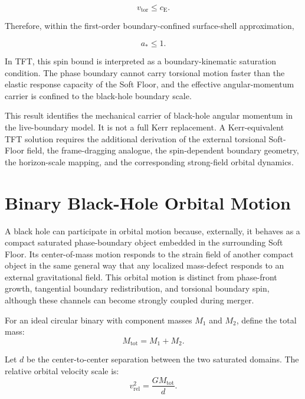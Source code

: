 \begin{equation}
    v_{\mathrm{tor}}
    \leq
    c_{\mathrm{E}}.
\end{equation}

Therefore, within the first-order boundary-confined surface-shell approximation,

\begin{equation}
    a_\ast
    \leq
    1.
\end{equation}

In TFT, this spin bound is interpreted as a boundary-kinematic saturation condition. The phase boundary cannot carry torsional motion faster than the elastic response capacity of the Soft Floor, and the effective angular-momentum carrier is confined to the black-hole boundary scale.

This result identifies the mechanical carrier of black-hole angular momentum in the live-boundary model. It is not a full Kerr replacement. A Kerr-equivalent TFT solution requires the additional derivation of the external torsional Soft-Floor field, the frame-dragging analogue, the spin-dependent boundary geometry, the horizon-scale mapping, and the corresponding strong-field orbital dynamics.

\section{Binary Black-Hole Orbital Motion}

A black hole can participate in orbital motion because, externally, it behaves as a compact saturated phase-boundary object embedded in the surrounding Soft Floor. Its center-of-mass motion responds to the strain field of another compact object in the same general way that any localized mass-defect responds to an external gravitational field. This orbital motion is distinct from phase-front growth, tangential boundary redistribution, and torsional boundary spin, although these channels can become strongly coupled during merger.

For an ideal circular binary with component masses $M_1$ and $M_2$, define the total mass:
\begin{equation}
    M_{\mathrm{tot}} = M_1 + M_2.
\end{equation}

Let $d$ be the center-to-center separation between the two saturated domains. The relative orbital velocity scale is:
\begin{equation}
    v_{\mathrm{rel}}^2 = \frac{G M_{\mathrm{tot}}}{d}.
\end{equation}

